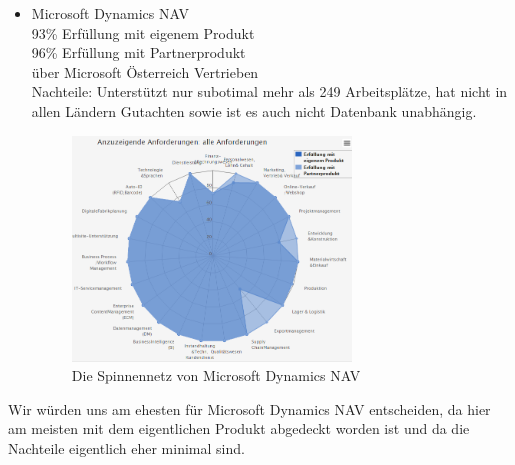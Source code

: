 \documentclass[12pt]{article}
\begin{document}
\begin{itemize}
\begin{figure}[here!]
\end{figure}\FloatBarrier
\noindent
\item Microsoft Dynamics NAV\\
		93\% Erfüllung mit eigenem Produkt\\
		96\% Erfüllung mit Partnerprodukt\\				
		über Microsoft Österreich Vertrieben\\
		Nachteile: Unterstützt nur subotimal mehr als 249 Arbeitsplätze, hat nicht in allen Ländern Gutachten sowie ist es auch nicht Datenbank unabhängig. 
		
\FloatBarrier
\begin{figure}[here!]
\centering
\includegraphics[width=0.7\textwidth]{images/matching4}
\caption{Die Spinnennetz von Microsoft Dynamics NAV}
\end{figure}\FloatBarrier
\noindent
\end{itemize}
Wir würden uns am ehesten für Microsoft Dynamics NAV entscheiden, da hier am meisten mit dem eigentlichen Produkt abgedeckt worden ist und da die Nachteile eigentlich eher minimal sind.
 

\end{document}
